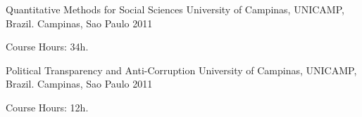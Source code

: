 \begin{cventries}
\cventry
         {Quantitative Methods for Social Sciences}
         {University of Campinas, UNICAMP, Brazil.}
         {Campinas, Sao Paulo}
         {2011}
         {
          \begin{cvitems}
            \item Course Hours: 34h.
           \end{cvitems}
         }
\cventry
         {Political Transparency and Anti-Corruption}
         {University of Campinas, UNICAMP, Brazil.}
         {Campinas, Sao Paulo}
         {2011}
         {
          \begin{cvitems}
            \item Course Hours: 12h.
           \end{cvitems}
         }
\end{cventries}
